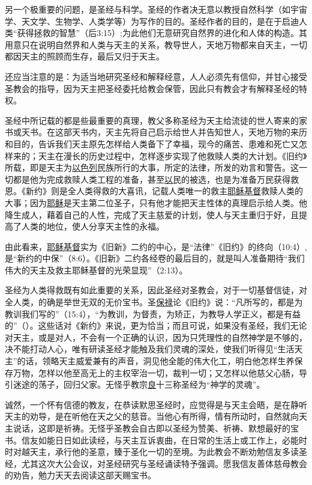 另一个极重要的问题，是圣经与科学。圣经的作者决无意以教授自然科学（如宇宙学、天文学、生物学、人类学等）为写作的目的。圣经作者的目的，是在于启迪人类“获得拯救的智慧”（后3:15）;为此他们无意研究自然界的进化和人体的构造。其用意只在说明自然界和人类与天主的关系，教导世人，天地万物都来自天主，一切都因天主的照顾而生存，最后又归于天主。

还应当注意的是：为适当地研究圣经和解释经意，人人必须先有信仰，并甘心接受圣教会的指导，因为天主把圣经委托给教会保管，因此只有教会才有解释圣经的特权。

圣经中所记载的都是些最重要的真理，教父多称圣经为天主给流徒的世人寄来的家书或天书。在这部天书内，天主先将自己启示给世人并告知世人，天地万物的来历和目的，告诉我们天主原先怎样给人类备下了幸福，现今的痛苦、患难和死亡又怎样来的；天主在漫长的历史过程中，怎样逐步实现了他救赎人类的大计划。《旧约》所载，即是天主为\uline{以色列}民族所行的大事，所定的法律，所发的劝言和警告。这一切都是他为完成救赎人类工程的准备，甚至\uline{以}民的被选，也是为准备万民获得救恩。《新约》则是全人类得救的大喜讯，记载人类唯一的救主\uline{耶稣}\uline{基督}救赎人类的大事；因为\uline{耶稣}是天主第二位圣子，只有他才能把天主性体的真理启示给人类。他降生成人，藉着自己的人性，完成了天主慈爱的计划，使人与天主重归于好，且提高了人类的地位，使人分享天主性的永福。

由此看来，\uline{耶稣}\uline{基督}实为《旧新》二约的中心，是“法律”《旧约》的终向（10:4）,是“新约的中保”（8:6）。《旧新》二约各经卷的最后目的，就是叫人准备期待“我们伟大的天主及救主耶稣基督的光荣显现”（2:13）。

圣经为人类得救既有如此重要的关系，因此圣经对圣教会，对于一切基督信徒，对全人类，的确是举世无双的无价宝书。圣\uline{保禄}论《旧约》说：“凡所写的，都是为教训我们写的”（15:4），“为教训，为督责，为矫正，为教导人学正义，都是有益的”（）。这些话对《新约》来说，更为恰当；而且可说，如果没有圣经，我们无论对天主，或是对人，不会有一个正确的认识，因为只凭理性的自然神学是不够的，决不能打动人心，唯有研读圣经才能触及我们灵魂的深处，使我们听得见“生活天主”的话，领略天主威爱兼有的声音，洞见他全能的伟大化工，明白他怎样生养保存万物，怎样以他至高无上的主权宰治一切，裁判一切；又怎样以他慈父心肠，导引迷途的荡子，回归父家。无怪乎教宗\uline{良}十三称圣经为“神学的灵魂”。

诚然，一个怀有信德的教友，在恭读默思圣经时，应觉得是与天主会晤，是在静听天主的劝导，是在听他在天之父的慈音。当他心有所得，情有所动时，自然就向天主说话，这即是祈祷。无怪乎圣教会自古即以圣经为赞美、祈祷、默想最好的宝书。信友如能日日如此读经，与天主互诉衷曲，在日常的生活上或工作上，必能时时对越天主，承行他的圣意，臻于圣化一切的至境。为此教会不断劝勉信友多读圣经，尤其这次大公会议，对圣经研究与圣经诵读特予强调。愿我信友善体慈母教会的劝告，勉力天天去阅读这部天赐宝书。
